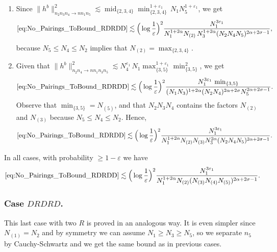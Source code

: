 \documentclass[11pt, xcolor = dvipsnames,reqno
]{amsart}
\theoremstyle{definition}
\theoremstyle{remark}
\begin{document}
\begin{itemize}
\begin{enumerate}
    \item Since $\lVert  h^b \rVert_{n_2n_3n_4 \to nn_1n_5}^2
    \lesssim
    \operatorname{mid}_{\{2,3,4\}} \operatorname{min}_{\{2,3,4\}}^{1+\varepsilon_1} \, N_1 N_5^{1+\varepsilon_1}$, 
    we get
    \begin{align*}
    \eqref{eq:No_Pairings_ToBound_RDRDD} 
    \lesssim  \Big(\log \frac{1}{\varepsilon} \Big)^2  \frac{N_1^{3\varepsilon_1}}{N_1^{1 + 2 \alpha} N_{(2)} \, N_3^{1+2\alpha}  (N_2N_4 N_5)^{2 \alpha + 2\sigma - 1} },
    \end{align*}
    because $N_5 \leq N_4 \leq N_2$ implies that $N_{(2)} = \operatorname{max}_{\{2,3,4\}}$.  

    \item Given that $\lVert  h^b \rVert_{n_2n_4 \to nn_1n_3n_5}^2
    \lesssim
    N_4^{\varepsilon_1} \, N_1 \operatorname{max}_{\{3,5\}}^{1+\varepsilon_1} \operatorname{min}_{\{3,5\}}^2$, 
    we get 
    \begin{align}
    \eqref{eq:No_Pairings_ToBound_RDRDD} \lesssim \Big(\log \frac{1}{\varepsilon} \Big)^2 \frac{N_1^{3\varepsilon_1} \, \operatorname{min}_{\{3,5\}}}{(N_1N_3)^{1+2\alpha} (N_2N_4)^{2\alpha + 2\sigma} N_5^{2 \alpha + 2\sigma - 1}}.
    \end{align}
    Observe that $\min_{\{3,5\}} = N_{(5)}$, and that $N_2N_3N_4$ contains the factors $N_{(2)}$ and $N_{(3)}$ because $N_5 \leq N_4 \leq N_2$. Hence,  
    \begin{align}
    \eqref{eq:No_Pairings_ToBound_RDRDD} \lesssim \Big(\log \frac{1}{\varepsilon} \Big)^2 \frac{N_1^{3\varepsilon_1} }{N_1^{1+2\alpha} N_{(2)} N_{(3)}  N_3^{2\alpha}  (N_2N_4N_5)^{2 \alpha + 2\sigma - 1}}.
    \end{align}
\end{enumerate}
In all cases, with probability $\geq 1 - \varepsilon$ we have
\begin{equation}
    \eqref{eq:No_Pairings_ToBound_RDRDD} 
    \lesssim \Big(\log \frac{1}{\varepsilon} \Big)^2 \frac{N_1^{3\varepsilon_1}}{N_1^{1+2\alpha} N_{(2)} (N_{(3)}N_{(4)} N_{(5)})^{2 \alpha + 2\sigma - 1}}.
\end{equation}

\end{itemize}



\subsubsection{Case $DRDRD$.} This last case with two $R$ is proved in an analogous way. It is even simpler since $N_{(1)} = N_2$ and by symmetry we can assume $N_1 \geq N_3 \geq N_5$, so we separate $n_5$ by Cauchy-Schwartz and we get the same bound as in previous cases.  
\end{document}
